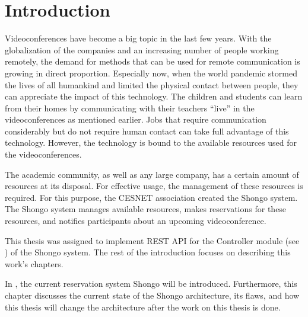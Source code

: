\chapter*{Introduction}

Videoconferences have become a big topic in the last few years. With the globalization of the companies and an increasing number of people working remotely, the demand for methods that can be used for remote communication is growing in direct proportion.
Especially now, when the world pandemic stormed the lives of all humankind and limited the physical contact between people, they can appreciate the impact of this technology. The children and students can learn from their homes by communicating with their teachers \enquote{live} in the videoconferences as mentioned earlier. Jobs that require communication considerably but do not require human contact can take full advantage of this technology.
However, the technology is bound to the available resources used for the videoconferences.

The academic community, as well as any large company, has a certain amount of resources at its disposal. For effective usage, the management of these resources is required.
For this purpose, the CESNET association created the Shongo system. The Shongo system manages available resources, makes reservations for these resources, and notifies participants about an upcoming videoconference.

This thesis was assigned to implement REST API for the Controller module (see ) of the Shongo system. The rest of the introduction focuses on describing this work's chapters.

In , the current reservation system Shongo will be introduced. Furthermore, this chapter discusses the current state of the Shongo architecture, its flaws, and how this thesis will change the architecture after the work on this thesis is done.

